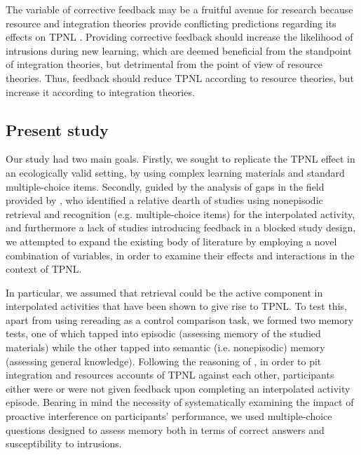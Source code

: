 \documentclass[../main.tex]{subfiles}
\begin{document}
The variable of corrective feedback may be a fruitful avenue for research because resource and integration theories provide conflicting predictions regarding its effects on TPNL \citep{chanRetrievalPotentiatesNew2018}. Providing corrective feedback should increase the likelihood of intrusions during new learning, which are deemed beneficial from the standpoint of integration theories, but detrimental from the point of view of resource theories. Thus, feedback should reduce TPNL according to resource theories, but increase it according to integration theories.


\subsection{Present study\label{present}}

Our study had two main goals. Firstly, we sought to replicate the TPNL effect in
an ecologically valid setting, by using complex learning materials and standard
multiple-choice items. Secondly, guided by the analysis of gaps in the field
provided by \cite{chanRetrievalPotentiatesNew2018}, who identified a relative
dearth of studies using nonepisodic retrieval and recognition (e.g.
multiple-choice items) for the interpolated activity, and furthermore a lack of
studies introducing feedback in a blocked study design, we attempted to expand
the existing body of literature by employing a novel combination of variables,
in order to examine their effects and interactions in the context of TPNL.

In particular, we assumed that retrieval could be the active component in
interpolated activities that have been shown to give rise to TPNL. To test this,
apart from using rereading as a control comparison task,
we formed two memory tests, one of which tapped into episodic
(assessing memory of the studied materials) while the other tapped into semantic
(i.e. nonepisodic) memory (assessing general knowledge). Following the 
reasoning of \cite{chanRetrievalPotentiatesNew2018}, in order to
pit integration and resources accounts of TPNL against each other, participants 
either were or were not given feedback upon completing an interpolated activity 
episode. Bearing in mind the necessity of systematically examining the impact 
of proactive interference on participants' performance, we used multiple-choice 
questions designed to assess memory both in terms of correct answers and 
susceptibility to intrusions.
\end{document}
